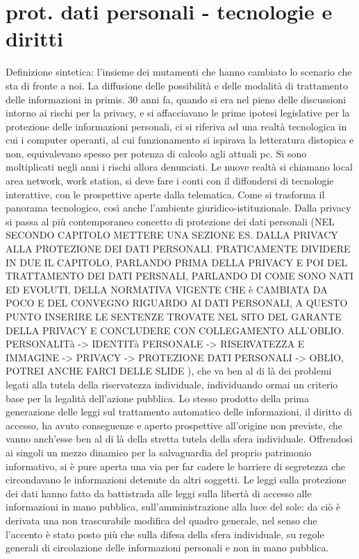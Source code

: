 \section{prot. dati personali  - tecnologie e diritti}
Definizione sintetica: l’insieme dei mutamenti che hanno cambiato lo scenario che sta di fronte a noi. La diffusione delle possibilità e delle modalità di trattamento delle informazioni in primis.
30 anni fa, quando si era nel pieno delle discussioni intorno ai rischi per la privacy, e si affacciavano le prime ipotesi legislative per la protezione delle informazioni personali, ci si riferiva ad una realtà tecnologica in cui i computer operanti, al cui funzionamento si ispirava la letteratura distopica e non, equivalevano spesso per potenza di calcolo agli attuali pc. Si sono moltiplicati negli anni i rischi allora denunciati. 
Le nuove realtà si chiamano local area network, work station, si deve fare i conti con il diffondersi di tecnologie interattive, con le prospettive aperte dalla telematica. Come si trasforma il panorama tecnologico, così anche l’ambiente giuridico-istituzionale. Dalla privacy si passa al più contemporaneo concetto di protezione dei dati personali (NEL SECONDO CAPITOLO METTERE UNA SEZIONE ES. DALLA PRIVACY ALLA PROTEZIONE DEI DATI PERSONALI. PRATICAMENTE DIVIDERE IN DUE IL CAPITOLO, PARLANDO PRIMA DELLA PRIVACY E POI DEL TRATTAMENTO DEI DATI PERSNALI, PARLANDO DI COME SONO NATI ED EVOLUTI, DELLA NORMATIVA VIGENTE CHE è CAMBIATA DA POCO E DEL CONVEGNO RIGUARDO AI DATI PERSONALI, A QUESTO PUNTO INSERIRE LE SENTENZE TROVATE NEL SITO DEL GARANTE DELLA PRIVACY E CONCLUDERE CON COLLEGAMENTO ALL’OBLIO.          PERSONALITà -> IDENTITà PERSONALE -> RISERVATEZZA E IMMAGINE -> PRIVACY -> PROTEZIONE DATI PERSONALI -> OBLIO, POTREI ANCHE FARCI DELLE SLIDE ), che va ben al di là dei problemi legati alla tutela della riservatezza individuale, individuando ormai un criterio base per la legalità dell’azione pubblica.
Lo stesso prodotto della prima generazione delle leggi sul trattamento automatico delle informazioni, il diritto di accesso, ha avuto conseguenze e aperto prospettive all’origine non previste, che vanno anch’esse ben al di là della stretta tutela della sfera individuale. Offrendosi ai singoli un mezzo dinamico per la salvaguardia del proprio patrimonio informativo, si è pure aperta una via per far cadere le barriere di segretezza che circondavano le informazioni detenute da altri soggetti. Le leggi sulla protezione dei dati hanno fatto da battistrada alle leggi sulla libertà di accesso alle informazioni in mano pubblica, sull’amministrazione alla luce del sole: da ciò è derivata una non trascurabile modifica del quadro generale, nel senso che l’accento è stato posto più che sulla difesa della sfera individuale, su regole generali di circolazione delle informazioni personali e non in mano pubblica.
